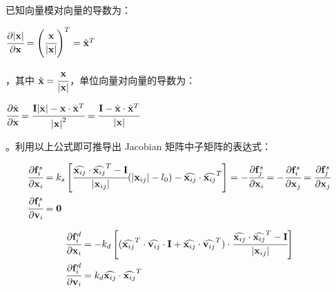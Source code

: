\documentclass[UTF8]{ctexart}
\begin{document}
已知向量模对向量的导数为：\begin{large}$ \cfrac{\partial \lvert \mathbf{x} \rvert}{\partial \mathbf{x}} = \left ( \cfrac{\mathbf{x}}{\lvert \mathbf{x} \rvert} \right )^T = {\hat{\mathbf{x}}}^T $\end{large}，其中 
$\hat{\mathbf{x}} = \cfrac{\mathbf{x}}{\lvert \mathbf{x} \rvert}$，单位向量对向量的导数为：\begin{large}$ \cfrac{\partial \hat{\mathbf{x}}}{\partial \mathbf{x}} = \cfrac{\mathbf{I} \lvert \mathbf{x} \rvert - \mathbf{x} \cdot {\hat{\mathbf{x}}}^T}{{\lvert \mathbf{x} \rvert}^2} = \cfrac{\mathbf{I} - \hat{\mathbf{x}} \cdot {\hat{\mathbf{x}}}^T}{\lvert \mathbf{x} \rvert}$ \end{large}。利用以上公式即可推导出 Jacobian 矩阵中子矩阵的表达式：\par

\begin{large}
\begin{equation}
\begin{split}
& \cfrac{\partial \mathbf{f}_i^s}{\partial \mathbf{x}_i} = k_s \left [ \cfrac{\widehat{\mathbf{x}_{ij}} \cdot \widehat{\mathbf{x}_{ij}}^T - \mathbf{I}}{\lvert \mathbf{x}_{ij} \rvert} (\lvert \mathbf{x}_{ij} \rvert - l_0) -  \widehat{\mathbf{x}_{ij}} \cdot \widehat{\mathbf{x}_{ij}}^T \right ] = 
- \cfrac{\partial \mathbf{f}_j^s}{\partial \mathbf{x}_i} = 
- \cfrac{\partial \mathbf{f}_i^s}{\partial \mathbf{x}_j} = 
\cfrac{\partial \mathbf{f}_j^s}{\partial \mathbf{x}_j} \\
& \cfrac{\partial \mathbf{f}_i^s}{\partial \mathbf{v}_i} = \mathbf{0}
\end{split}
\end{equation}
\end{large}

\begin{large}
\begin{equation}
\begin{split}
& \cfrac{\partial \mathbf{f}_i^d}{\partial \mathbf{x}_i} = -k_d \left[ 
(\widehat{\mathbf{x}_{ij}}^T \cdot \widehat{\mathbf{v}_{ij}} \cdot \mathbf{I} +
\widehat{\mathbf{x}_{ij}} \cdot \widehat{\mathbf{v}_{ij}}^T
) \cdot
\cfrac{\widehat{\mathbf{x}_{ij}} \cdot \widehat{\mathbf{x}_{ij}}^T - \mathbf{I}}{\lvert \mathbf{x}_{ij} \rvert}
\right] \\
& \cfrac{\partial \mathbf{f}_i^d}{\partial \mathbf{v}_i} = k_d \widehat{\mathbf{x}_{ij}} \cdot \widehat{\mathbf{x}_{ij}}^T
\end{split}
\end{equation}
\end{large}
\end{document}
